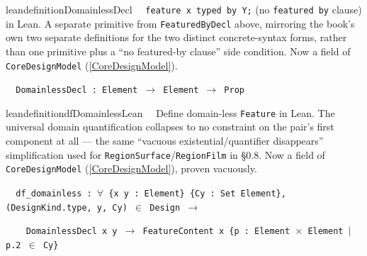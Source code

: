 \begin{restatable}{leandefinition}{DomainlessDecl}~~ \texttt{feature x typed by Y;} (no
\texttt{featured by} clause) in Lean. A separate primitive from \texttt{FeaturedByDecl} above, mirroring the
book's own two separate definitions for the two distinct concrete-syntax forms, rather than one primitive
plus a ``no featured-by clause'' side condition. Now a field of \texttt{CoreDesignModel} (\ref{CoreDesignModel}).

\texttt{~~DomainlessDecl : Element $\to$ Element $\to$ Prop}
\label{DomainlessDecl}
\end{restatable}

\begin{restatable}{leandefinition}{dfDomainlessLean}~~ Define domain-less \texttt{Feature}
in Lean. The universal domain quantification collapses to no constraint on the pair's first component at
all --- the same ``vacuous existential/quantifier disappears'' simplification used for
\texttt{RegionSurface}/\texttt{RegionFilm} in \S0.8. Now a field of \texttt{CoreDesignModel}
(\ref{CoreDesignModel}), proven vacuously.

\texttt{~~df\_domainless : $\forall$ \{x y : Element\} \{Cy : Set Element\}, (DesignKind.type, y, Cy) $\in$ Design $\to$}

\texttt{~~~~DomainlessDecl x y $\to$ FeatureContent x \{p : Element $\times$ Element $\vert$ p.2 $\in$ Cy\}}
\label{df_domainless}
\end{restatable}


